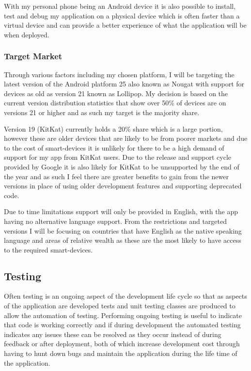 With my personal phone being an Android device it is also possible to
install, test and debug my application on a physical device which is
often faster than a virtual device and can provide a better experience
of what the application will be when deployed.

\subsubsection{Target Market}\label{target-market}

Through various factors including my chosen platform, I will be
targeting the latest version of the Android platform 25 also known as
Nougat with support for devices as old as version 21 known as Lollipop.
My decision is based on the current version distribution statistics that
show over 50\% of devices are on versions 21 or higher and as such my
target is the majority share.

Version 19 (KitKat) currently holds a 20\% share which is a large
portion, however these are older devices that are likely to be from
poorer markets and due to the cost of smart-devices it is unlikely for
there to be a high demand of support for my app from KitKat users. Due
to the release and support cycle provided by Google it is also likely
for KitKat to be unsupported by the end of the year and as such I feel
there are greater benefits to gain from the newer versions in place of
using older development features and supporting deprecated code.

Due to time limitations support will only be provided in English, with
the app having no alternative language support. From the restrictions
and targeted versions I will be focusing on countries that have English
as the native speaking language and areas of relative wealth as these
are the most likely to have access to the required smart-devices.

\subsection{Testing}\label{testing}

Often testing is an ongoing aspect of the development life cycle so that
as aspects of the application are developed tests and unit testing
classes are produced to allow the automation of testing. Performing
ongoing testing is useful to indicate that code is working correctly and
if during development the automated testing indicates any issues these
can be resolved as they occur instead of during feedback or after
deployment, both of which increase development cost through having to
hunt down bugs and maintain the application during the life time of the
application.

